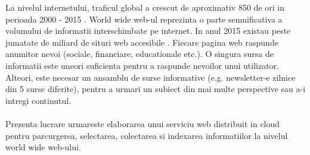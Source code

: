 La nivelul internetului, traficul global a crescut de aproximativ 850 de ori in perioada 2000 - 2015 \cite{cisco-internet-traffic}. World wide web-ul reprezinta o parte semnificativa a volumului de informatii interschimbate pe internet. In anul 2015 existau peste jumatate de miliard de situri web accesibile \cite{http://www.internetlivestats.com/total-number-of-websites/}. Fiecare pagina web raspunde anumitor nevoi (sociale, financiare, educationale etc.). O singura sursa de informatii este uneori suficienta pentru a raspunde nevoilor unui utilizator. Alteori, este necesar un ansamblu de surse informative (e.g. newsletter-e zilnice din 5 surse diferite), pentru a urmari un subiect din mai multe perspective sau a-i intregi continutul.
\\
\\
Prezenta lucrare urmareste elaborarea unui serviciu web distribuit in cloud pentru parcurgerea, selectarea, colectarea si indexarea informatiilor la nivelul world wide web-ului.
